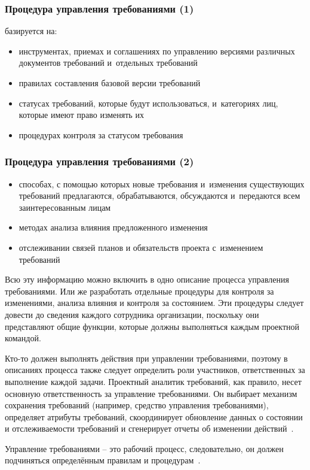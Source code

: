 \documentclass{../industrial-development}
\begin{document}
\begin{frame} \frametitle{Процедура управления требованиями (1)}
базируется на:
	\begin{itemize}
\item инструментах, приемах и соглашениях по управлению версиями различных документов требований и~отдельных требований
\item правилах составления базовой версии требований
\item статусах требований, которые будут использоваться, и~категориях лиц, которые имеют право изменять их
\item процедурах контроля за статусом требования
  	\end{itemize}
\end{frame}

\begin{frame} \frametitle{Процедура управления требованиями (2)}
	\begin{itemize}
\item способах, с помощью которых новые требования и~изменения существующих требований предлагаются, обрабатываются, обсуждаются и~передаются всем заинтересованным лицам
\item методах анализа влияния предложенного изменения
\item отслеживании связей планов и обязательств проекта с~изменением требований
  	\end{itemize}
\end{frame}

\lecturenotes

Всю эту информацию можно включить в одно описание процесса управления требованиями. Или же разработать отдельные процедуры для контроля за изменениями, анализа влияния и контроля за состоянием. Эти процедуры следует довести до сведения каждого сотрудника организации, поскольку они представляют общие функции, которые должны выполняться каждым проектной командой.

Кто-то должен выполнять действия при управлении требованиями, поэтому в описаниях процесса также следует определить роли участников, ответственных за выполнение каждой задачи. Проектный аналитик требований, как правило, несет основную ответственность за управление требованиями. Он выбирает механизм сохранения требований (например, средство управления требованиями), определяет атрибуты требований, скоординирует обновление данных о состоянии и отслеживаемости требований и сгенерирует отчеты об изменении действий~\cite[с.~345]{Wiegers}.

Управление требованиями – это рабочий процесс, следовательно, он должен подчиняться определённым правилам и процедурам~\cite[с.~72]{Maglinec}.
\end{document}
